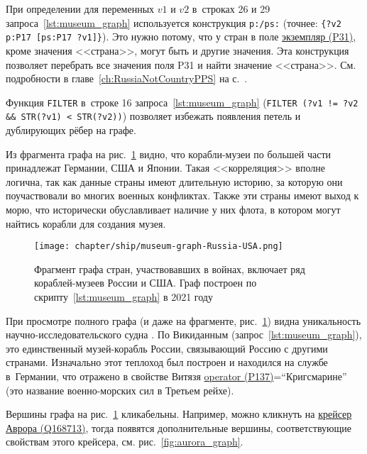 \newpage
    При определении  для переменных $v1$ и $v2$ 
    в~строках 26 и 29 запроса~\ref{lst:museum_graph} 
    используется конструкция \texttt{p:/ps:} (точнее: \texttt{\{?v2 p:P17 [ps:P17 ?v1]\}}). 
    Это нужно потому, что у стран в поле 
    \href{https://www.wikidata.org/wiki/Property:P31}{экземпляр (P31)}, 
    кроме значения <<страна>>, могут быть и другие значения. 
    Эта конструкция позволяет перебрать все значения поля P31 и найти значение <<страна>>.
    См. подробности в главе~\ref{ch:RussiaNotCountryPPS} на с.~\pageref{ch:RussiaNotCountryPPS}.

    Функция \lstinline|FILTER|
    в~строке 16 запроса~\ref{lst:museum_graph} 
    \mbox{(\lstinline|FILTER (?v1 != ?v2 && STR(?v1) < STR(?v2))|)} 
    позволяет избежать появления петель и дублирующих рёбер на графе.

Из фрагмента графа на рис.~\ref{fig:museum_graph} видно, 
что корабли-музеи по большей части принадлежат Германии, США и Японии. 
Такая <<корреляция>> вполне логична, так как данные страны имеют длительную историю, 
за которую они поучаствовали во многих военных конфликтах. 
Также эти страны имеют выход к морю, что исторически обуславливает наличие у них флота, 
в котором могут найтись корабли для создания музея.

\begin{figure}[h]
  \texttt{[image: chapter/ship/museum-graph-Russia-USA.png]}
  \caption[Граф стран и кораблей-музеев, 2021 год.]{Фрагмент графа стран, участвовавших в войнах, включает ряд кораблей-музеев России и США. Граф построен по скрипту~\protect\ref{lst:museum_graph} в 2021 году}%
  \label{fig:museum_graph}%
\end{figure}

При просмотре полного графа (и даже на фрагменте, рис.~\ref{fig:museum_graph}) 
видна уникальность научно-исследовательского судна . 
По Викиданным (запрос~\ref{lst:museum_graph}), 
это единственный музей-корабль России, связывающий Россию с другими странами. 
Изначально этот теплоход был построен и находился на службе в~Германии, 
что отражено в свойстве Витязя 
\href{https://www.wikidata.org/wiki/Property:P137}{operator (P137)}=``Кригсма\-рине'' 
(это название военно-морских сил в Третьем рейхе).

Вершины графа на рис.~\ref{fig:museum_graph} кликабельны. 
Например, можно кликнуть на \href{https://www.wikidata.org/wiki/Q168713}{крейсер Аврора (Q168713)}, 
тогда появятся дополнительные вершины, соответствующие свойствам этого крейсера, см. рис.~\ref{fig:aurora_graph}.

